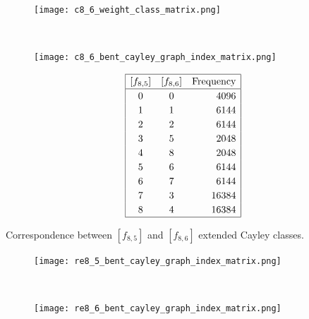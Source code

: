 \documentclass[12pt,a4paper]{article}
\begin{document}
\begin{figure}[!bhpt] %
\centering
\begin{minipage}{.48\textwidth}
  \centering
  \texttt{[image: c8\_6\_weight\_class\_matrix.png]}
  \label{fig:c8_6_weight_class_matrix}
\end{minipage}%
~~~~
\begin{minipage}{.48\textwidth}
  \centering
  \texttt{[image: c8\_6\_bent\_cayley\_graph\_index\_matrix.png]}
  \label{fig:c8_6_bent_cayley_graph_index_matrix}
\end{minipage}
\end{figure}

\begin{table}[!bhpt] %
%
\small{}
\begin{align*}
\def\arraystretch{1.2}
\begin{array}{|ccr|}
\hline
[f_{8,5}] &
[f_{8,6}] &
\text{Frequency}
\\
\hline
  0 &    0 &  4096
\\
  1 &    1 &  6144
\\
  2 &    2 &  6144
\\
  3 &    5 &  2048
\\
  4 &    8 &  2048
\\
  5 &    6 &  6144
\\
  6 &    7 &  6144
\\
  7 &    3 & 16384
\\
  8 &    4 & 16384
\\
\hline
\end{array}
\end{align*}
\caption{Correspondence between $[f_{8,5}]$ and $[f_{8,6}]$ extended Cayley classes.}
\label{tab-c8_5-c8_6_EC_classes}
\end{table}

\begin{figure}[!bhpt] %
\centering
\begin{minipage}{.48\textwidth}
  \centering
  \texttt{[image: re8\_5\_bent\_cayley\_graph\_index\_matrix.png]}
  \label{fig:re8_5_bent_cayley_graph_index_matrix}
\end{minipage}
~~
\begin{minipage}{.48\textwidth}
  \centering
  \texttt{[image: re8\_6\_bent\_cayley\_graph\_index\_matrix.png]}
  \label{fig:re8_6_bent_cayley_graph_index_matrix}
\end{minipage}
\end{figure}
\end{document}
